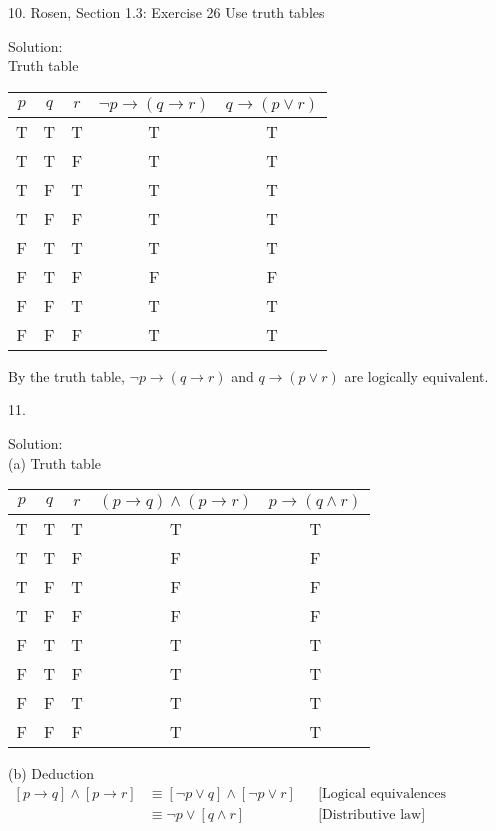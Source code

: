 \documentclass[12pt]{article}
\begin{document}
\newpage

10. Rosen, Section 1.3: Exercise 26 Use truth tables

\indent Solution:\\
\indent Truth table\\

\begin{center}
\begin{tabular}{c|c|c|c|c}
    $p$ & $q$ & $r$ & $\lnot p \to (q \to r)$ & $q \to (p \lor r)$ \\
\hline
T & T & T & T & T\\
T & T & F & T & T\\
T & F & T & T & T\\
T & F & F & T & T\\
F & T & T & T & T\\
F & T & F & F & F\\
F & F & T & T & T\\
F & F & F & T & T
\end{tabular}
\end{center}

By the truth table, $\lnot p \to (q \to r)$ and $q \to (p \lor r)$ are logically equivalent. 
\newpage

11. 

\indent Solution:\\
\indent (a) Truth table\\
\begin{center}
\begin{tabular}{c|c|c|c|c}
    $p$ & $q$ & $r$ & $(p \to q) \land (p \to r)$ & $p \to (q \land r)$ \\
\hline
T & T & T & T & T \\
T & T & F & F & F \\
T & F & T & F & F \\
T & F & F & F & F \\
F & T & T & T & T \\
F & T & F & T & T \\
F & F & T & T & T \\
F & F & F & T & T
\end{tabular}
\end{center}

\indent (b) Deduction\\
\begin{align}
\label{pImpqAndpImpr}
[p \to q] \land [p \to r] &\equiv [\lnot p \lor q] \land [\lnot p \lor r]  && \text{[Logical equivalences Involving Implications]}\\
                          &\equiv \lnot p \lor [q \land r] && \text{[Distributive law]} 
\end{align}
\end{document}
